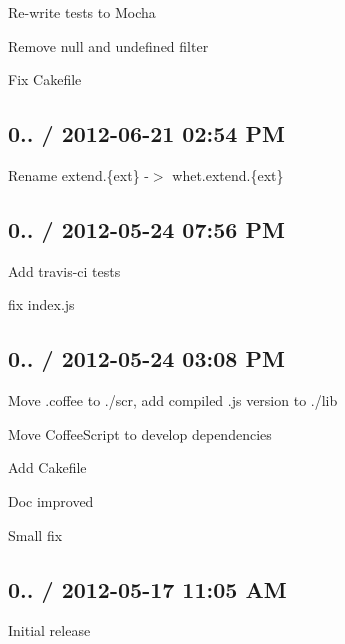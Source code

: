 
\begin{DoxyItemize}
\item Re-\/write tests to Mocha
\item Remove \textquotesingle{}null\textquotesingle{} and \textquotesingle{}undefined\textquotesingle{} filter
\item Fix Cakefile
\end{DoxyItemize}

\subsection*{0.. / 2012-\/06-\/21 02\+:54 PM}


\begin{DoxyItemize}
\item Rename extend.\{ext\} -\/$>$ whet.\+extend.\{ext\}
\end{DoxyItemize}

\subsection*{0.. / 2012-\/05-\/24 07\+:56 PM}


\begin{DoxyItemize}
\item Add travis-\/ci tests
\item fix index.\+js
\end{DoxyItemize}

\subsection*{0.. / 2012-\/05-\/24 03\+:08 PM}


\begin{DoxyItemize}
\item Move .coffee to ./scr, add compiled .js version to ./lib
\item Move Coffee\+Script to develop dependencies
\item Add Cakefile
\item Doc improved
\item Small fix
\end{DoxyItemize}

\subsection*{0.. / 2012-\/05-\/17 11\+:05 AM}


\begin{DoxyItemize}
\item Initial release 
\end{DoxyItemize}